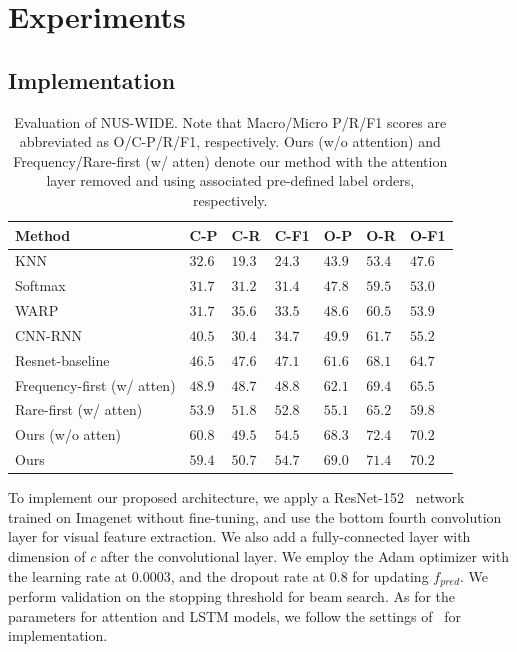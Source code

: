 \documentclass[letterpaper]{article} %
\begin{document}
\section{Experiments}
\subsection{Implementation}
\tabcolsep=1.5pt
\begin{table}[]
	\centering	
		\caption{Evaluation of NUS-WIDE. Note that Macro/Micro P/R/F1 scores are abbreviated as O/C-P/R/F1, respectively. Ours (w/o attention) and Frequency/Rare-first (w/ atten) denote our method with the attention layer removed and using associated pre-defined label orders, respectively.\\}
	
	\begin{tabular}{l||lll|lll}
		\hline
		Method  & C-P  & C-R  & C-F1 & O-P  & O-R  & O-F1 \\ \hline
		KNN		& $32.6$ & $19.3$ & $24.3$ & $43.9$ & $53.4$ & $47.6$ \\
		Softmax & $31.7$ & $31.2$ & $31.4$ & $47.8$ & $59.5$ & $53.0$ \\
		WARP    & $31.7$ & $35.6$ & $33.5$ & $48.6$ & $60.5$ & $53.9$ \\
		CNN-RNN & $40.5$ & $30.4$ & $34.7$ & $49.9$ & $61.7$ & $55.2$ \\
        Resnet-baseline   & $46.5$ & $47.6$ & $47.1$ & $61.6$ & $68.1$ & $64.7$ \\
        Frequency-first (w/ atten)   & $48.9$ & $48.7$ & $48.8$ & $62.1$ & $69.4$ & $65.5$ \\
        Rare-first (w/ atten)   & $53.9$ & $51.8$ & $52.8$ & $55.1$ & $65.2$ & $59.8$ \\
        Ours (w/o atten)   & $60.8$ & $49.5$ & $54.5$ & $68.3$ & $72.4$ & $70.2$ \\
		Ours    & $59.4$ & $50.7$ & $\mathbf{54.7}$ & $69.0$ & $71.4$ & $\mathbf{70.2}$ \\ \hline
	\end{tabular}
	\label{table:nuswide}
\end{table}

To implement our proposed architecture, we apply a ResNet-152~\cite{he2016deep} network trained on Imagenet without fine-tuning, and use the bottom fourth convolution layer for visual feature extraction. We also add a fully-connected layer with dimension of $c$ after the convolutional layer. We employ the Adam optimizer with the learning rate at 0.0003, and the dropout rate at 0.8 for updating $f_{pred}$. We perform validation on the stopping threshold for beam search. As for the parameters for attention and LSTM models, we follow the settings of~\cite{xu2015show} for implementation.
\end{document}
